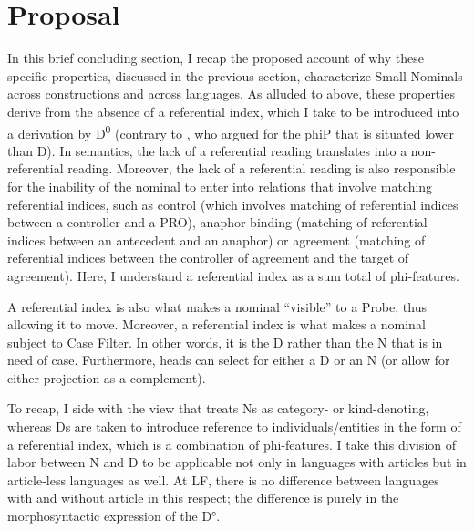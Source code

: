 \documentclass[output=paper]{langsci/langscibook}
\begin{document}
\section{Proposal}
\label{peresec:4}

In this brief concluding section, I recap the proposed account of 
why these specific properties, discussed in the previous section, characterize Small Nominals across constructions and across languages. 
As alluded to above, these properties derive from the absence of a referential index, 
which I take to be introduced into a derivation by D\textsuperscript{0} (contrary to \citealt{DechaineWiltschko2002}, 
who argued for the phiP that is situated lower than D). 
In semantics, the lack of a referential reading translates into a non-referential reading. 
Moreover, the lack of a referential reading is also responsible for the inability of the nominal 
to enter into relations that involve matching referential indices, such as control (which involves matching of referential indices between a controller and a PRO), 
anaphor binding (matching of referential indices between an antecedent and an anaphor) 
or agreement (matching of referential indices between the controller of agreement and the target of agreement). 
Here, I understand a referential index as a sum total of phi-features. 

A referential index is also what makes a nominal “visible” to a Probe, thus allowing it to move. 
Moreover, a referential index is what makes a nominal subject to Case Filter. 
In other words, it is the D rather than the N that is in need of case. 
Furthermore, heads can select for either a D or an N (or allow for either projection as a complement). 

To recap, I side with the view that treats Ns as category- or kind-denoting, 
whereas Ds are taken to introduce reference to individuals/entities in the form of a referential index, 
which is a combination of phi-features. 
I take this division of labor between N and D to be applicable not only in languages with articles but in article-less languages as well. 
At LF, there is no difference between languages with and without article in this respect; 
the difference is purely in the morphosyntactic expression of the D°.

\sloppy\printbibliography[heading=subbibliography,notkeyword=this]
\end{document}
